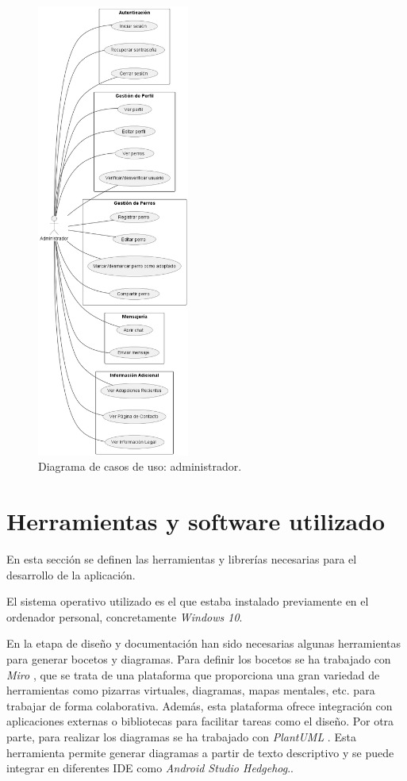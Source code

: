 \documentclass[a4paper, 12pt]{article}
\begin{document}
\begin{figure}[H]
	\begin{center}
		{\includegraphics[width=5cm]{diagram/Admin.png}\par}
		\caption{Diagrama de casos de uso: administrador.}
	\end{center}
\end{figure}





\newpage
\section{Herramientas y software utilizado}

En esta sección se definen las herramientas y librerías necesarias para el desarrollo de la aplicación.

El sistema operativo utilizado es el que estaba instalado previamente en el ordenador personal, concretamente \textit{Windows 10}.

En la etapa de diseño y documentación han sido necesarias algunas herramientas para generar bocetos y diagramas. Para definir los bocetos se ha trabajado con \textit{Miro}  \cite{miro}, que se trata de una plataforma que proporciona una gran variedad de herramientas como pizarras virtuales, diagramas, mapas mentales, etc. para trabajar de forma colaborativa. Además, esta plataforma ofrece integración con aplicaciones externas o bibliotecas para facilitar tareas como el diseño. Por otra parte, para realizar los diagramas se ha trabajado con \textit{PlantUML}  \cite{plantuml}. Esta herramienta permite generar diagramas a partir de texto descriptivo y se puede integrar en diferentes IDE como \textit{Android Studio Hedgehog}..
\end{document}
